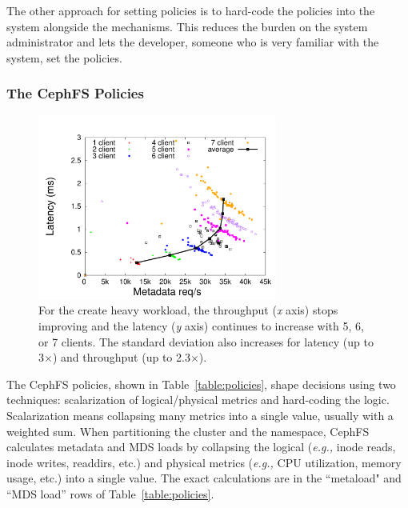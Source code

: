 The other approach for setting policies is to hard-code the policies into the system alongside the mechanisms. This reduces the burden on the system administrator and lets the developer, someone who is very familiar with the system, set the policies. 

\subsubsection*{The CephFS Policies}
\label{the-cephfs-policies}
\begin{figure}[tb]
	\centering
	\includegraphics[width=0.7\textwidth]{./chapters/mantle/figures/creates-latency-thruput-clients.pdf}
    \caption{For the create heavy workload, the throughput ({\it x} axis) stops improving and the latency ({\it y} axis) continues to increase with 5, 6, or 7 clients. The standard deviation also increases for latency (up to 3\(\times\)) and throughput (up to 2.3\(\times\)). \label{figure:creates-latency-thruput-clients}} 
\end{figure}

The CephFS policies, shown in Table~\ref{table:policies}, shape decisions using two techniques: scalarization of logical/physical metrics and hard-coding the logic. Scalarization means collapsing many metrics into a single value, usually with a weighted sum. When partitioning the cluster and the namespace, CephFS calculates metadata and MDS loads by collapsing the logical ({\it e.g.,} inode reads, inode writes, readdirs, etc.) and physical metrics ({\it e.g.,} CPU utilization, memory usage, etc.) into a single value. The exact calculations are in the ``metaload" and ``MDS load'' rows of Table~\ref{table:policies}. 

